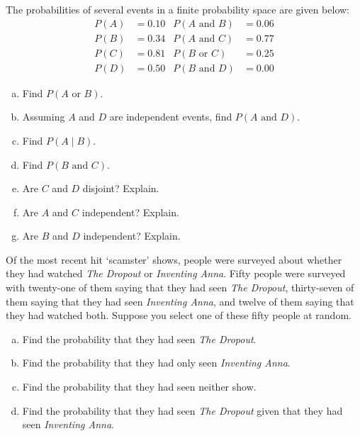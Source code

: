 \documentclass[11pt,letterpaper]{article}
\begin{document}

 The probabilities of several events in a finite probability space are given below:
	\[
	\begin{aligned}
	P(A)&= 0.10 & P(A \text{ and } B)&= 0.06 \\
	P(B)&= 0.34 & P(A \text{ and } C)&= 0.77 \\
	P(C)&= 0.81 & P(B \text{ or } C)&= 0.25 \\
	P(D)&= 0.50 & P(B \text{ and } D)&= 0.00
	\end{aligned}
	\] 
\begin{enumerate}[(a)]
\item Find $P(A \text{ or } B)$. 
\item Assuming $A$ and $D$ are independent events, find $P(A \text{ and } D)$.
\item Find $P(A \;|\; B)$.
\item Find $P(B \text{ and } C)$. 
\item Are $C$ and $D$ disjoint? Explain.
\item Are $A$ and $C$ independent? Explain.
\item Are $B$ and $D$ independent? Explain.
\end{enumerate} 



\newpage



 Of the most recent hit `scamster' shows, people were surveyed about whether they had watched \textit{The Dropout} or \textit{Inventing Anna}. Fifty people were surveyed with twenty-one of them saying that they had seen \textit{The Dropout}, thirty-seven of them saying that they had seen \textit{Inventing Anna}, and twelve of them saying that they had watched both. Suppose you select one of these fifty people at random. 
	\begin{enumerate}[(a)]
	\item Find the probability that they had seen \textit{The Dropout}.
	\item Find the probability that they had only seen \textit{Inventing Anna}.
	\item Find the probability that they had seen neither show.
	\item Find the probability that they had seen \textit{The Dropout} given that they had seen \textit{Inventing Anna}.
	\end{enumerate}
\end{document}
